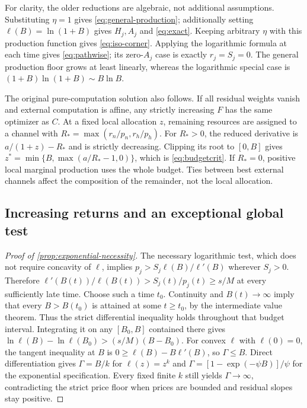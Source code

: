 For clarity, the older reductions are algebraic, not additional
assumptions. Substituting $\eta=1$ gives
\cref{eq:general-production}; additionally setting
$\ell(B)=\ln(1+B)$ gives $H_j,A_j$ and \cref{eq:exact}.
Keeping arbitrary $\eta$ with this production function gives
\cref{eq:iso-corner}. Applying the logarithmic formula at each time
gives \cref{eq:pathwise}; its zero-$A_j$ case is exactly
$r_j=S_j=0$. The general production floor grows at least linearly,
whereas the logarithmic special case is $(1+B)\ln(1+B)\sim B\ln B$.

The original pure-computation solution also follows. If all residual
weights vanish and external computation is affine, any strictly
increasing $F$ has the same optimizer as $C$. At a fixed local
allocation $z$, remaining resources are assigned to a channel with
$R_*=\max(r_n/p_n,r_h/p_h)$. For $R_*>0$, the reduced derivative is
$a/(1+z)-R_*$ and is strictly decreasing. Clipping its root to $[0,B]$
gives $z^*=\min\{B,\max(a/R_*-1,0)\}$, which is
\cref{eq:budgetcrit}. If $R_*=0$, positive local marginal production
uses the whole budget. Ties between best external channels affect the
composition of the remainder, not the local allocation.

\subsection{Increasing returns and an exceptional global test}
\label{app:returns-proof}
\begin{proof}[Proof of \cref{prop:exponential-necessity}]
The necessary logarithmic test, which does not require concavity of
$\ell$, implies $p_j>S_j\ell(B)/\ell'(B)$ wherever $S_j>0$.
Therefore $\ell'(B(t))/\ell(B(t))>S_j(t)/p_j(t)\geq s/M$
at every sufficiently late time. Choose such a time $t_0$.
Continuity and $B(t)\to\infty$ imply that every $B>B(t_0)$ is attained
at some $t\geq t_0$, by the intermediate value theorem. Thus the
strict differential inequality holds throughout that budget interval.
Integrating it on any $[B_0,B]$ contained there gives
$\ln\ell(B)-\ln\ell(B_0)>(s/M)(B-B_0)$.
For convex $\ell$ with $\ell(0)=0$, the tangent inequality at $B$
is $0\geq\ell(B)-B\ell'(B)$, so $\Gamma\leq B$.
Direct differentiation gives $\Gamma=B/k$ for $\ell(z)=z^k$ and
$\Gamma=[1-\exp(-\psi B)]/\psi$ for the exponential specification.
Every fixed finite $k$ still yields $\Gamma\to\infty$, contradicting
the strict price floor when prices are bounded and residual slopes stay
positive.
\end{proof}

